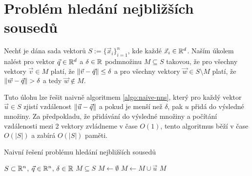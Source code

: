 

\section{Problém hledání nejbližších sousedů}

\label{defi:nns}
\begin{defi}
  Nechť je dána sada vektorů $S := \{\vec{x}_i\}_{i = 1}^n$, kde každé $\vec{x}_i \in \mathbb{R}^d$. Naším úkolem nalést pro vektor $\vec{q} \in \mathbb{R}^d$ a $\delta \in \mathbb{R}$ podmnožinu $M \subseteq S$ takovou, že pro všechny vektory $\vec{v} \in M$ platí, že $\|\vec{v} - \vec{q}\| \leq \delta$ a pro všechny vektory $\vec{w} \in S \setminus M$ platí, že $\|\vec{w} - \vec{q}\| > \delta$ a tedy $\vec{w} \not\in M$.
\end{defi}

Tuto úlohu lze řešit naivně algoritmem \ref{algo:naive-nns}, který pro každý vektor $\vec{u} \in S$ zjistí vzdálenost $\|\vec{u} - \vec{q}\|$ a pokud je menší než $\delta$, pak $u$ přidá do výsledné množiny. Za předpokladu, že přidávání do výsledné množiny a počítání vzdálenosti mezi 2 vektory zvládneme v čase $O(1)$, tento algoritmus běží v čase $O(|S|)$ a zabírá $O(|S|)$ paměti.

\begin{algorithm}[h!]
  \caption{Naivní řešení problému hledání nejbližších sousedů}
  \label{algo:naive-nns}
  \begin{algorithmic}
    \REQUIRE $S \subset \mathbb{R}^n$, $\vec{q} \in \mathbb{R}^n$, $\delta \in \mathbb{R}$
    \ENSURE $M \subseteq S$
    \STATE $M \leftarrow \emptyset$
          \STATE $M \leftarrow M \cup \vec{u}$
        \ENDIF
    \ENDFOR
    \RETURN $M$
  \end{algorithmic}
\end{algorithm}

